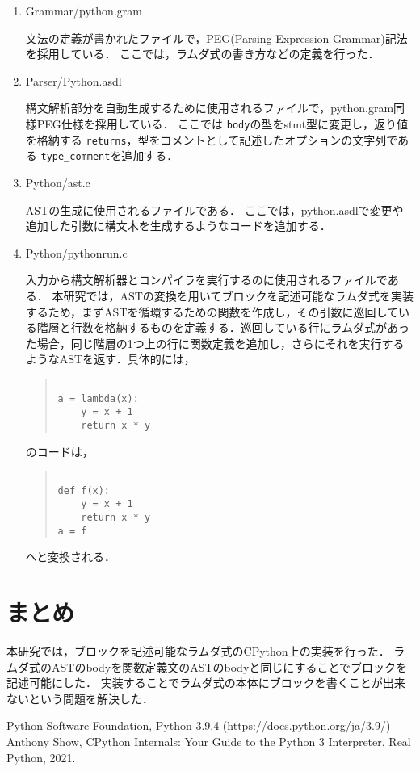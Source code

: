 \documentclass[twocolumn]{jsarticle}
\begin{document}
\begin{enumerate}
  \item Grammar/python.gram
  
  文法の定義が書かれたファイルで，PEG(Parsing Expression Grammar)記法を採用している．
  ここでは，ラムダ式の書き方などの定義を行った．
  
  \item Parser/Python.asdl
  
  構文解析部分を自動生成するために使用されるファイルで，python.gram同様PEG仕様を採用している．
  ここでは \texttt{body}の型をstmt型に変更し，返り値を格納する \texttt{returns}，型をコメントとして記述したオプションの文字列である \texttt{type\_comment}を追加する．
  
  \item Python/ast.c
  
  ASTの生成に使用されるファイルである．
  ここでは，python.asdlで変更や追加した引数に構文木を生成するようなコードを追加する．
  
  \item Python/pythonrun.c
  
  入力から構文解析器とコンパイラを実行するのに使用されるファイルである．
  本研究では，ASTの変換を用いてブロックを記述可能なラムダ式を実装するため，まずASTを循環するための関数を作成し，その引数に巡回している階層と行数を格納するものを定義する．巡回している行にラムダ式があった場合，同じ階層の1つ上の行に関数定義を追加し，さらにそれを実行するようなASTを返す．具体的には，
  
  \begin{quote}
  \setlength{\baselineskip}{12pt}
  \begin{verbatim}
  
a = lambda(x):
    y = x + 1
    return x * y
  \end{verbatim}
  \end{quote}
  のコードは，
    \begin{quote}
  \setlength{\baselineskip}{12pt}
  \begin{verbatim}
  
def f(x):
    y = x + 1
    return x * y
a = f
  \end{verbatim}
  \end{quote}
  へと変換される．
  
\end{enumerate}

\section{まとめ}
本研究では，ブロックを記述可能なラムダ式のCPython上の実装を行った．
ラムダ式のASTのbodyを関数定義文のASTのbodyと同じにすることでブロックを記述可能にした．
実装することでラムダ式の本体にブロックを書くことが出来ないという問題を解決した．
\begin{thebibliography}{99}
 Python Software Foundation, Python 3.9.4 (\url{https://docs.python.org/ja/3.9/})
 Anthony Show, CPython Internals: Your Guide to the Python 3 Interpreter, Real Python, 2021.
\end{thebibliography}
\end{document}
